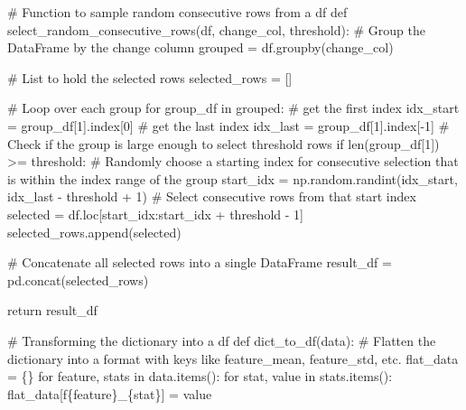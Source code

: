 \documentclass[
  letterpaper,
  DIV=11,
  numbers=noendperiod]{scrreprt}
\newenvironment{Shaded}{\begin{snugshade}}{\end{snugshade}}
\newcommand{\BuiltInTok}[1]{\textcolor[rgb]{0.00,0.23,0.31}{#1}}
\newcommand{\CommentTok}[1]{\textcolor[rgb]{0.37,0.37,0.37}{#1}}
\newcommand{\ControlFlowTok}[1]{\textcolor[rgb]{0.00,0.23,0.31}{#1}}
\newcommand{\DecValTok}[1]{\textcolor[rgb]{0.68,0.00,0.00}{#1}}
\newcommand{\KeywordTok}[1]{\textcolor[rgb]{0.00,0.23,0.31}{#1}}
\newcommand{\NormalTok}[1]{\textcolor[rgb]{0.00,0.23,0.31}{#1}}
\newcommand{\OperatorTok}[1]{\textcolor[rgb]{0.37,0.37,0.37}{#1}}
\newcommand{\SpecialCharTok}[1]{\textcolor[rgb]{0.37,0.37,0.37}{#1}}
\newcommand{\SpecialStringTok}[1]{\textcolor[rgb]{0.13,0.47,0.30}{#1}}
\begin{document}
\begin{Shaded}
\begin{Highlighting}[]
\CommentTok{\# Function to sample random consecutive rows from a df}
\KeywordTok{def}\NormalTok{ select\_random\_consecutive\_rows(df, change\_col, threshold):}
    \CommentTok{\# Group the DataFrame by the \textquotesingle{}change\textquotesingle{} column}
\NormalTok{    grouped }\OperatorTok{=}\NormalTok{ df.groupby(change\_col)}
    
    \CommentTok{\# List to hold the selected rows}
\NormalTok{    selected\_rows }\OperatorTok{=}\NormalTok{ []}

    \CommentTok{\# Loop over each group}
    \ControlFlowTok{for}\NormalTok{ group\_df }\KeywordTok{in}\NormalTok{ grouped:}
        \CommentTok{\# get the first index}
\NormalTok{        idx\_start }\OperatorTok{=}\NormalTok{ group\_df[}\DecValTok{1}\NormalTok{].index[}\DecValTok{0}\NormalTok{]}
        \CommentTok{\# get the last index}
\NormalTok{        idx\_last }\OperatorTok{=}\NormalTok{ group\_df[}\DecValTok{1}\NormalTok{].index[}\OperatorTok{{-}}\DecValTok{1}\NormalTok{]}
        \CommentTok{\# Check if the group is large enough to select \textquotesingle{}threshold\textquotesingle{} rows}
        \ControlFlowTok{if} \BuiltInTok{len}\NormalTok{(group\_df[}\DecValTok{1}\NormalTok{]) }\OperatorTok{\textgreater{}=}\NormalTok{ threshold:}
            \CommentTok{\# Randomly choose a starting index for consecutive selection that is within the index range of the group}
\NormalTok{            start\_idx }\OperatorTok{=}\NormalTok{ np.random.randint(idx\_start, idx\_last }\OperatorTok{{-}}\NormalTok{ threshold }\OperatorTok{+} \DecValTok{1}\NormalTok{)}
            \CommentTok{\# Select consecutive rows from that start index}
\NormalTok{            selected }\OperatorTok{=}\NormalTok{ df.loc[start\_idx:start\_idx }\OperatorTok{+}\NormalTok{ threshold }\OperatorTok{{-}} \DecValTok{1}\NormalTok{]}
\NormalTok{            selected\_rows.append(selected)}
    
    \CommentTok{\# Concatenate all selected rows into a single DataFrame}
\NormalTok{    result\_df }\OperatorTok{=}\NormalTok{ pd.concat(selected\_rows)}
    
    \ControlFlowTok{return}\NormalTok{ result\_df}

\CommentTok{\# Transforming the dictionary into a df}
\KeywordTok{def}\NormalTok{ dict\_to\_df(data):}
    \CommentTok{\# Flatten the dictionary into a format with keys like \textquotesingle{}feature\_mean\textquotesingle{}, \textquotesingle{}feature\_std\textquotesingle{}, etc.}
\NormalTok{    flat\_data }\OperatorTok{=}\NormalTok{ \{\}}
    \ControlFlowTok{for}\NormalTok{ feature, stats }\KeywordTok{in}\NormalTok{ data.items():}
        \ControlFlowTok{for}\NormalTok{ stat, value }\KeywordTok{in}\NormalTok{ stats.items():}
\NormalTok{            flat\_data[}\SpecialStringTok{f\textquotesingle{}}\SpecialCharTok{\{}\NormalTok{feature}\SpecialCharTok{\}}\SpecialStringTok{\_}\SpecialCharTok{\{}\NormalTok{stat}\SpecialCharTok{\}}\SpecialStringTok{\textquotesingle{}}\NormalTok{] }\OperatorTok{=}\NormalTok{ value}


\end{Highlighting}
\end{Shaded}
\end{document}
